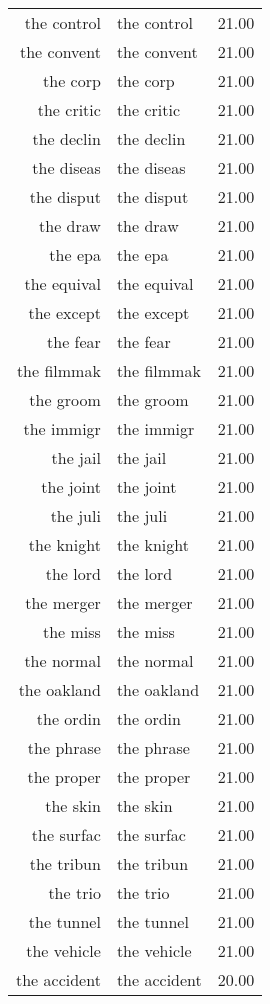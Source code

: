 \begin{table}[ht]
\begin{tabular}{rlr}
  the control & the control & 21.00 \\ 
  the convent & the convent & 21.00 \\ 
  the corp & the corp & 21.00 \\ 
  the critic & the critic & 21.00 \\ 
  the declin & the declin & 21.00 \\ 
  the diseas & the diseas & 21.00 \\ 
  the disput & the disput & 21.00 \\ 
  the draw & the draw & 21.00 \\ 
  the epa & the epa & 21.00 \\ 
  the equival & the equival & 21.00 \\ 
  the except & the except & 21.00 \\ 
  the fear & the fear & 21.00 \\ 
  the filmmak & the filmmak & 21.00 \\ 
  the groom & the groom & 21.00 \\ 
  the immigr & the immigr & 21.00 \\ 
  the jail & the jail & 21.00 \\ 
  the joint & the joint & 21.00 \\ 
  the juli & the juli & 21.00 \\ 
  the knight & the knight & 21.00 \\ 
  the lord & the lord & 21.00 \\ 
  the merger & the merger & 21.00 \\ 
  the miss & the miss & 21.00 \\ 
  the normal & the normal & 21.00 \\ 
  the oakland & the oakland & 21.00 \\ 
  the ordin & the ordin & 21.00 \\ 
  the phrase & the phrase & 21.00 \\ 
  the proper & the proper & 21.00 \\ 
  the skin & the skin & 21.00 \\ 
  the surfac & the surfac & 21.00 \\ 
  the tribun & the tribun & 21.00 \\ 
  the trio & the trio & 21.00 \\ 
  the tunnel & the tunnel & 21.00 \\ 
  the vehicle & the vehicle & 21.00 \\ 
  the accident & the accident & 20.00 \\ 

\end{tabular}
\end{table}
